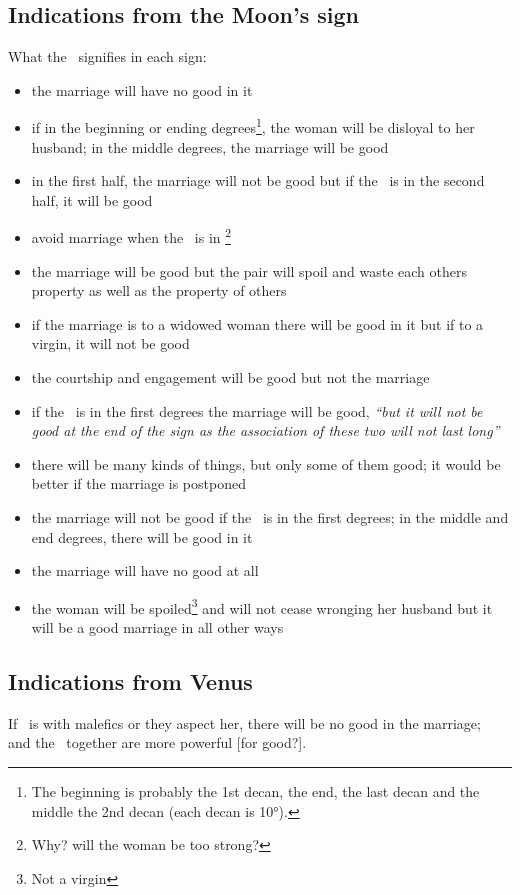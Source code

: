 \subsection{Indications from the Moon's sign}
What the \Moon\, signifies in each sign:
\begin{itemize}[topsep=0em,itemsep=0em]
\item[\Aries] the marriage will have no good in it
\item[\Taurus] if in the beginning or ending degrees\footnote{The beginning is probably the 1st decan, the end, the last decan and the middle the 2nd decan (each decan is 10°).}, the woman will be disloyal to her husband; in the middle degrees, the marriage will be good
\item[\Gemini] in the first half, the marriage will not be good but if the \Moon\, is in the second half, it will be good
\item[\Cancer] avoid marriage when the \Moon\, is in \Cancer\footnote{Why? will the woman be too strong?}
\item[\Leo] the marriage will be good but the pair will spoil and waste each others property as well as the property of others
\item[\Virgo] if the marriage is to a widowed woman there will be good in it but if to a virgin, it will not be good
\item[\Libra] the courtship and engagement will be good but not the marriage
\item[\Scorpio] if the \Moon\, is in the first degrees the marriage will be good, \textsl{``but it will not be good at the end of the sign as the association of these two will not last long''}
\item[\Sagittarius] there will be many kinds of things, but only some of them good; it would be better if the marriage is postponed
\item[\Capricorn] the marriage will not be good if the \Moon\, is in the first degrees; in the middle and end degrees, there will be good in it
\item[\Aquarius] the marriage will have no good at all
\item[\Pisces] the woman will be spoiled\footnote{Not a virgin} and will not cease wronging her husband but it will be a good marriage in all other ways
\end{itemize}

\subsection{Indications from Venus}
If \Venus\, is with malefics or they aspect her, there will be no good in the marriage; \Venus\, and the \Moon\, together are more powerful [for good?].

